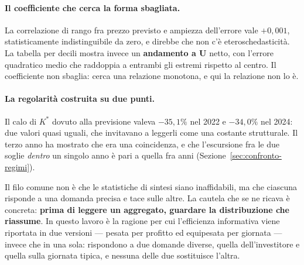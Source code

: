 \paragraph{Il coefficiente che cerca la forma sbagliata.} La correlazione di rango fra prezzo
previsto e ampiezza dell'errore vale $+0{,}001$, statisticamente indistinguibile da zero, e
direbbe che non c'\`e eteroschedasticit\`a. La tabella per decili mostra invece un
\textbf{andamento a U} netto, con l'errore quadratico medio che raddoppia a entrambi gli
estremi rispetto al centro. Il coefficiente non sbaglia: cerca una relazione monotona, e qui
la relazione non lo \`e.

\paragraph{La regolarit\`a costruita su due punti.} Il calo di $K^*$ dovuto alla previsione
valeva $-35{,}1\%$ nel 2022 e $-34{,}0\%$ nel 2024: due valori quasi uguali, che invitavano a
leggerli come una costante strutturale. Il terzo anno ha mostrato che era una coincidenza, e
che l'escursione fra le due soglie \emph{dentro} un singolo anno \`e pari a quella fra anni
(Sezione~\ref{sec:confronto-regimi}).

\medskip
Il filo comune non \`e che le statistiche di sintesi siano inaffidabili, ma che ciascuna
risponde a una domanda precisa e tace sulle altre. La cautela che se ne ricava \`e concreta:
\textbf{prima di leggere un aggregato, guardare la distribuzione che riassume}. In questo
lavoro \`e la ragione per cui l'efficienza informativa viene riportata in due versioni ---
pesata per profitto ed equipesata per giornata --- invece che in una sola: rispondono a due
domande diverse, quella dell'investitore e quella sulla giornata tipica, e nessuna delle due
sostituisce l'altra.
